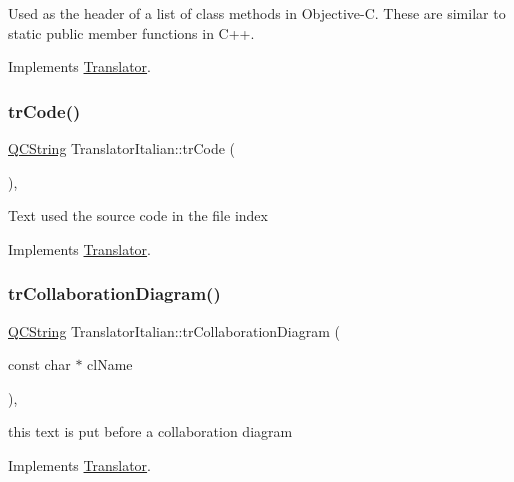 Used as the header of a list of class methods in Objective-\/C. These are similar to static public member functions in C++. 

Implements \mbox{\hyperlink{class_translator}{Translator}}.

\mbox{\label{class_translator_italian_a18e1cf382060720830d8aa931280f0ec}} 
\subsubsection{\texorpdfstring{trCode()}{trCode()}}
{\footnotesize\ttfamily \mbox{\hyperlink{class_q_c_string}{Q\+C\+String}} Translator\+Italian\+::tr\+Code (\begin{DoxyParamCaption}{ }\end{DoxyParamCaption})\hspace{0.3cm}{\ttfamily [inline]}, {\ttfamily [virtual]}}

Text used the source code in the file index 

Implements \mbox{\hyperlink{class_translator}{Translator}}.

\mbox{\label{class_translator_italian_a5750ef5b048366564b190a2c3e24dd35}} 
\subsubsection{\texorpdfstring{trCollaborationDiagram()}{trCollaborationDiagram()}}
{\footnotesize\ttfamily \mbox{\hyperlink{class_q_c_string}{Q\+C\+String}} Translator\+Italian\+::tr\+Collaboration\+Diagram (\begin{DoxyParamCaption}\item[{const char $\ast$}]{cl\+Name }\end{DoxyParamCaption})\hspace{0.3cm}{\ttfamily [inline]}, {\ttfamily [virtual]}}

this text is put before a collaboration diagram 

Implements \mbox{\hyperlink{class_translator}{Translator}}.

\mbox{\label{class_translator_italian_af48d3951c706847a9bd4d8c5b8e0cb3f}} 
